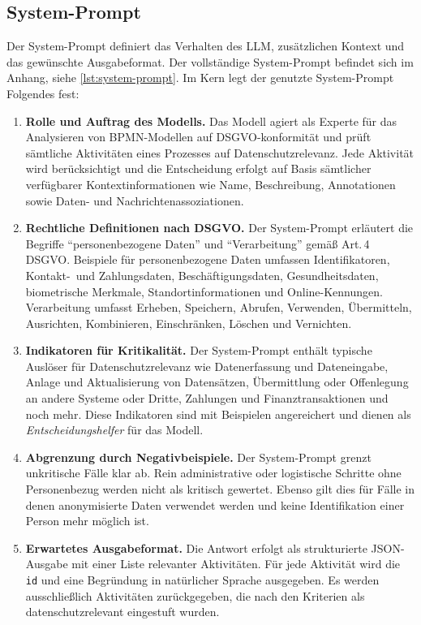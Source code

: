 \subsection*{System-Prompt}

Der System-Prompt definiert das Verhalten des \ac{LLM}, zusätzlichen Kontext und das gewünschte Ausgabeformat. Der vollständige System-Prompt befindet sich im Anhang, siehe \ref{lst:system-prompt}. Im Kern legt der genutzte System-Prompt Folgendes fest:

\begin{enumerate}
    \item \textbf{Rolle und Auftrag des Modells.} Das Modell agiert als Experte für das Analysieren von \ac{BPMN}-Modellen auf \ac{DSGVO}-konformität und prüft sämtliche Aktivitäten eines Prozesses auf Datenschutzrelevanz. Jede Aktivität wird berücksichtigt und die Entscheidung erfolgt auf Basis sämtlicher verfügbarer Kontextinformationen wie Name, Beschreibung, Annotationen sowie Daten- und Nachrichtenassoziationen.
    \item \textbf{Rechtliche Definitionen nach \ac{DSGVO}.} Der System-Prompt erläutert die Begriffe \enquote{personenbezogene Daten} und \enquote{Verarbeitung} gemäß Art.\,4 \ac{DSGVO}. Beispiele für personenbezogene Daten umfassen Identifikatoren, Kontakt-\linebreak~und Zahlungsdaten, Beschäftigungsdaten, Gesundheitsdaten, biometrische Merkmale, Standortinformationen und Online-Kennungen. Verarbeitung umfasst Erheben, Speichern, Abrufen, Verwenden, Übermitteln, Ausrichten, Kombinieren, Einschränken, Löschen und Vernichten.
    \item \textbf{Indikatoren für Kritikalität.} Der System-Prompt enthält typische Auslöser für Datenschutzrelevanz wie Datenerfassung und Dateneingabe, Anlage und Aktualisierung von Datensätzen, Übermittlung oder Offenlegung an andere Systeme oder Dritte, Zahlungen und Finanztransaktionen und noch mehr. Diese Indikatoren sind mit Beispielen angereichert und dienen als \emph{Entscheidungshelfer} für das Modell.
    \item \textbf{Abgrenzung durch Negativbeispiele.} Der System-Prompt grenzt unkritische Fälle klar ab. Rein administrative oder logistische Schritte ohne Personenbezug werden nicht als kritisch gewertet. Ebenso gilt dies für Fälle in denen anonymisierte Daten verwendet werden und keine Identifikation einer Person mehr möglich ist.
    \item \textbf{Erwartetes Ausgabeformat.} Die Antwort erfolgt als strukturierte JSON-\hspace{0pt}Ausgabe mit einer Liste relevanter Aktivitäten. Für jede Aktivität wird die \texttt{id} und eine Begründung in natürlicher Sprache ausgegeben. Es werden ausschließlich Aktivitäten zurückgegeben, die nach den Kriterien als datenschutzrelevant eingestuft wurden.
\end{enumerate}

